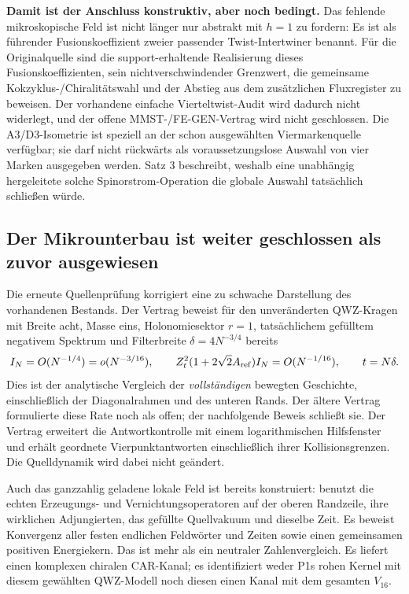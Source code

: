 \textbf{Damit ist der Anschluss konstruktiv, aber noch bedingt.} Das fehlende mikroskopische Feld ist nicht länger nur abstrakt mit $h=1$ zu fordern: Es ist als führender Fusionskoeffizient zweier passender Twist-Intertwiner benannt. Für die Originalquelle sind die support-erhaltende Realisierung dieses Fusionskoeffizienten, sein nichtverschwindender Grenzwert, die gemeinsame Kokzyklus-/Chiralitätswahl und der Abstieg aus dem zusätzlichen Fluxregister zu beweisen. Der vorhandene einfache Vierteltwist-Audit wird dadurch nicht widerlegt, und der offene MMST-/FE-GEN-Vertrag wird nicht geschlossen. Die A3/D3-Isometrie ist speziell an der schon ausgewählten Viermarkenquelle verfügbar; sie darf nicht rückwärts als voraussetzungslose Auswahl von vier Marken ausgegeben werden. Satz 3 beschreibt, weshalb eine unabhängig hergeleitete solche Spinorstrom-Operation die globale Auswahl tatsächlich schließen würde.

\subsection{Der Mikrounterbau ist weiter geschlossen als zuvor ausgewiesen}\label{sec:microscopicpairbridge}

Die erneute Quellenprüfung korrigiert eine zu schwache Darstellung des vorhandenen Bestands. Der Vertrag  beweist für den unveränderten QWZ-Kragen mit Breite acht, Masse eins, Holonomiesektor $r=1$, tatsächlichem gefülltem negativem Spektrum und Filterbreite $\delta=4N^{-3/4}$ bereits
\[
 I_N=O(N^{-1/4})=o(N^{-3/16}),\qquad
 Z_t^2(1+2\sqrt2A_{\rm ref})I_N=O(N^{-1/16}),
 \qquad t=N\delta.
\]
Dies ist der analytische Vergleich der \emph{vollständigen} bewegten Geschichte, einschließlich der Diagonalrahmen und des unteren Rands. Der ältere Vertrag  formulierte diese Rate noch als offen; der nachfolgende Beweis schließt sie. Der Vertrag  erweitert die Antwortkontrolle mit einem logarithmischen Hilfsfenster und erhält geordnete Vierpunktantworten einschließlich ihrer Kollisionsgrenzen. Die Quelldynamik wird dabei nicht geändert.

Auch das ganzzahlig geladene lokale Feld ist bereits konstruiert:  benutzt die echten Erzeugungs- und Vernichtungsoperatoren auf der oberen Randzeile, ihre wirklichen Adjungierten, das gefüllte Quellvakuum und dieselbe Zeit. Es beweist Konvergenz aller festen endlichen Feldwörter und Zeiten sowie einen gemeinsamen positiven Energiekern. Das ist mehr als ein neutraler Zahlenvergleich. Es liefert einen komplexen chiralen CAR-Kanal; es identifiziert weder P1s rohen Kernel mit diesem gewählten QWZ-Modell noch diesen einen Kanal mit dem gesamten $V_{16}$.

